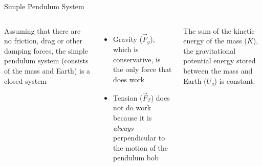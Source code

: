 \documentclass[12pt,compress,aspectratio=169]{beamer}
\begin{document}
\begin{frame}{Simple Pendulum System}
  \begin{columns}
    Assuming that there are no friction, drag or other damping forces, the
    simple pendulum system (consists of the mass and Earth) is a closed system
    \begin{itemize}
    \item Gravity ($\vec F_g$), which is conservative, is the only force that
      does work
    \item Tension ($\vec F_T$) does not do work because it is \emph{always}
      perpendicular to the motion of the pendulum bob
    \end{itemize}
    The sum of the kinetic energy of the mass ($K$), the gravitational
    potential energy stored between the mass and Earth ($U_g$) is constant:

    
    \centering
  \end{columns}
\end{frame}
\end{document}

